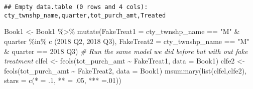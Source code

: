 \documentclass[
]{article}
\newenvironment{Shaded}{\begin{snugshade}}{\end{snugshade}}
\newcommand{\AttributeTok}[1]{\textcolor[rgb]{0.77,0.63,0.00}{#1}}
\newcommand{\CommentTok}[1]{\textcolor[rgb]{0.56,0.35,0.01}{\textit{#1}}}
\newcommand{\DecValTok}[1]{\textcolor[rgb]{0.00,0.00,0.81}{#1}}
\newcommand{\FunctionTok}[1]{\textcolor[rgb]{0.00,0.00,0.00}{#1}}
\newcommand{\NormalTok}[1]{#1}
\newcommand{\OtherTok}[1]{\textcolor[rgb]{0.56,0.35,0.01}{#1}}
\newcommand{\SpecialCharTok}[1]{\textcolor[rgb]{0.00,0.00,0.00}{#1}}
\newcommand{\StringTok}[1]{\textcolor[rgb]{0.31,0.60,0.02}{#1}}
\begin{document}
\begin{verbatim}
## Empty data.table (0 rows and 4 cols): cty_twnshp_name,quarter,tot_purch_amt,Treated
\end{verbatim}

\begin{Shaded}
\begin{Highlighting}[]
\NormalTok{Book1 }\OtherTok{\textless{}{-}}\NormalTok{ Book1 }\SpecialCharTok{\%\textgreater{}\%} 
  \FunctionTok{mutate}\NormalTok{(}\AttributeTok{FakeTreat1 =}\NormalTok{ cty\_twnshp\_name }\SpecialCharTok{==} \StringTok{"M"} \SpecialCharTok{\&}
\NormalTok{           quarter }\SpecialCharTok{\%in\%} \FunctionTok{c}\NormalTok{ (}\StringTok{\textquotesingle{}2018 Q2\textquotesingle{}}\NormalTok{, }\StringTok{\textquotesingle{}2018 Q3\textquotesingle{}}\NormalTok{),}
         \AttributeTok{FakeTreat2 =}\NormalTok{ cty\_twnshp\_name }\SpecialCharTok{==} \StringTok{"M"} \SpecialCharTok{\&}
\NormalTok{           quarter }\SpecialCharTok{==} \StringTok{\textquotesingle{}2018 Q3\textquotesingle{}}\NormalTok{)}
\CommentTok{\# Run the same model we did before but with out fake treatment}
\NormalTok{clfel }\OtherTok{\textless{}{-}} \FunctionTok{feols}\NormalTok{(tot\_purch\_amt }\SpecialCharTok{\textasciitilde{}}\NormalTok{ FakeTreat1,}
               \AttributeTok{data =}\NormalTok{ Book1)}
\NormalTok{clfe2 }\OtherTok{\textless{}{-}} \FunctionTok{feols}\NormalTok{(tot\_purch\_amt }\SpecialCharTok{\textasciitilde{}}\NormalTok{ FakeTreat2,}
               \AttributeTok{data =}\NormalTok{ Book1)}
\FunctionTok{msummary}\NormalTok{(}\FunctionTok{list}\NormalTok{(clfel,clfe2), }\AttributeTok{stars =} \FunctionTok{c}\NormalTok{(}\StringTok{\textquotesingle{}*\textquotesingle{}} \OtherTok{=}\NormalTok{ .}\DecValTok{1}\NormalTok{, }\StringTok{\textquotesingle{}**\textquotesingle{}} \OtherTok{=}\NormalTok{ .}\DecValTok{05}\NormalTok{, }\StringTok{\textquotesingle{}***\textquotesingle{}} \OtherTok{=}\NormalTok{.}\DecValTok{01}\NormalTok{))}
\end{Highlighting}
\end{Shaded}
\end{document}
